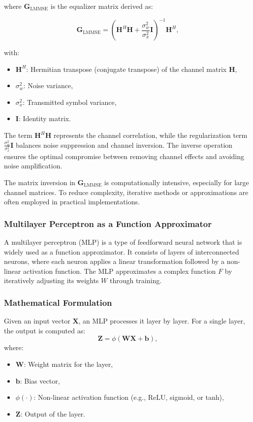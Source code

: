 where \( \mathbf{G}_{\text{LMMSE}} \) is the equalizer matrix derived as:

\begin{equation}
\mathbf{G}_{\text{LMMSE}} = \left( \mathbf{H}^H \mathbf{H} + \frac{\sigma_w^2}{\sigma_x^2} \mathbf{I} \right)^{-1} \mathbf{H}^H,
\label{eq:lmmse_weight_matrix}
\end{equation}

with:
\begin{itemize}
    \item \( \mathbf{H}^H \): Hermitian transpose (conjugate transpose) of the channel matrix \( \mathbf{H} \),
    \item \( \sigma_w^2 \): Noise variance,
    \item \( \sigma_x^2 \): Transmitted symbol variance,
    \item \( \mathbf{I} \): Identity matrix.
\end{itemize}

The term \( \mathbf{H}^H \mathbf{H} \) represents the channel correlation, while the regularization term \( \frac{\sigma_w^2}{\sigma_x^2} \mathbf{I} \) balances noise suppression and channel inversion. The inverse operation ensures the optimal compromise between removing channel effects and avoiding noise amplification.

The matrix inversion in \( \mathbf{G}_{\text{LMMSE}} \) is computationally intensive, especially for large channel matrices. To reduce complexity, iterative methods or approximations are often employed in practical implementations.

\subsubsection{Multilayer Perceptron as a Function Approximator}

A multilayer perceptron (MLP) is a type of feedforward neural network that is widely used as a function approximator. It consists of layers of interconnected neurons, where each neuron applies a linear transformation followed by a non-linear activation function. The MLP approximates a complex function \( F \) by iteratively adjusting its weights \( W \) through training.

\subsubsection{Mathematical Formulation}
Given an input vector \( \mathbf{X} \), an MLP processes it layer by layer. For a single layer, the output is computed as:
\begin{equation}
\mathbf{Z} = \phi(\mathbf{W} \mathbf{X} + \mathbf{b}),
\label{eq:mlp_layer}
\end{equation}
where:
\begin{itemize}
    \item \( \mathbf{W} \): Weight matrix for the layer,
    \item \( \mathbf{b} \): Bias vector,
    \item \( \phi(\cdot) \): Non-linear activation function (e.g., ReLU, sigmoid, or tanh),
    \item \( \mathbf{Z} \): Output of the layer.
\end{itemize}

